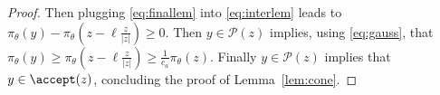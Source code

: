 \documentclass[10pt,twocolumn,letterpaper]{article}
\begin{document}
\begin{proof}
Then plugging \eqref{eq:finallem} into \eqref{eq:interlem} leads to $\pi_\theta(y) - \pi_\theta(z- \ell \frac{z}{|z|}) \geq 0$.
Then $y \in \mathcal{P}(z)$ implies, using \eqref{eq:gauss}, that $\pi_\theta(y) \geq \pi_\theta(z- \ell \frac{z}{|z|}) \geq \frac{1}{c_a} \pi_\theta(z)$. 
 Finally $y \in \mathcal{P}(z)$ implies that $y \in \accept(z)$, concluding the proof of Lemma~\ref{lem:cone}.
 
\end{proof}
\end{document}
